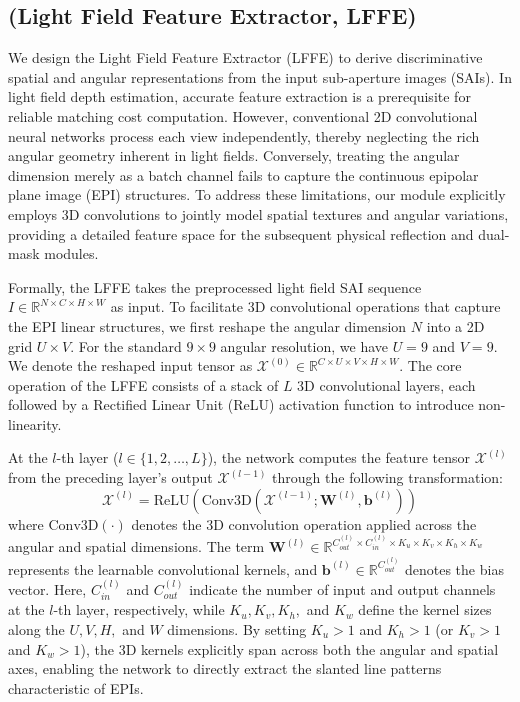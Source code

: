 \documentclass[lettersize,journal]{IEEEtran}
\begin{document}
\subsection{(Light Field Feature Extractor, LFFE)}

We design the Light Field Feature Extractor (LFFE) to derive discriminative spatial and angular representations from the input sub-aperture images (SAIs). In light field depth estimation, accurate feature extraction is a prerequisite for reliable matching cost computation. However, conventional 2D convolutional neural networks process each view independently, thereby neglecting the rich angular geometry inherent in light fields. Conversely, treating the angular dimension merely as a batch channel fails to capture the continuous epipolar plane image (EPI) structures. To address these limitations, our module explicitly employs 3D convolutions to jointly model spatial textures and angular variations, providing a detailed feature space for the subsequent physical reflection and dual-mask modules.

Formally, the LFFE takes the preprocessed light field SAI sequence $I \in \mathbb{R}^{N \times C \times H \times W}$ as input. To facilitate 3D convolutional operations that capture the EPI linear structures, we first reshape the angular dimension $N$ into a 2D grid $U \times V$. For the standard $9 \times 9$ angular resolution, we have $U=9$ and $V=9$. We denote the reshaped input tensor as $\mathcal{X}^{(0)} \in \mathbb{R}^{C \times U \times V \times H \times W}$. The core operation of the LFFE consists of a stack of $L$ 3D convolutional layers, each followed by a Rectified Linear Unit (ReLU) activation function to introduce non-linearity. 

At the $l$-th layer ($l \in \{1, 2, \dots, L\}$), the network computes the feature tensor $\mathcal{X}^{(l)}$ from the preceding layer's output $\mathcal{X}^{(l-1)}$ through the following transformation:
\begin{equation}
\label{eq:eq1}
\mathcal{X}^{(l)} = \text{ReLU}\left( \text{Conv3D}\left(\mathcal{X}^{(l-1)}; \mathbf{W}^{(l)}, \mathbf{b}^{(l)}\right) \right)
\end{equation}
where $\text{Conv3D}(\cdot)$ denotes the 3D convolution operation applied across the angular and spatial dimensions. The term $\mathbf{W}^{(l)} \in \mathbb{R}^{C_{out}^{(l)} \times C_{in}^{(l)} \times K_u \times K_v \times K_h \times K_w}$ represents the learnable convolutional kernels, and $\mathbf{b}^{(l)} \in \mathbb{R}^{C_{out}^{(l)}}$ denotes the bias vector. Here, $C_{in}^{(l)}$ and $C_{out}^{(l)}$ indicate the number of input and output channels at the $l$-th layer, respectively, while $K_u, K_v, K_h,$ and $K_w$ define the kernel sizes along the $U, V, H,$ and $W$ dimensions. By setting $K_u > 1$ and $K_h > 1$ (or $K_v > 1$ and $K_w > 1$), the 3D kernels explicitly span across both the angular and spatial axes, enabling the network to directly extract the slanted line patterns characteristic of EPIs.
\end{document}
